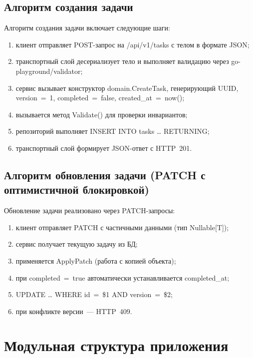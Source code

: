 \documentclass[a4paper,14pt]{extarticle}
\begin{document}
\subsection{Алгоритм создания задачи}

Алгоритм создания задачи включает следующие шаги:
\begin{enumerate}[leftmargin=1.25cm, itemsep=0pt]
  \item клиент отправляет POST-запрос на /api/v1/tasks с телом в формате JSON;
  \item транспортный слой десериализует тело и выполняет валидацию через go-playground/validator;
  \item сервис вызывает конструктор domain.CreateTask, генерирующий UUID, version~=~1, completed~=~false, created\_at~=~now();
  \item вызывается метод Validate() для проверки инвариантов;
  \item репозиторий выполняет INSERT INTO tasks \ldots{} RETURNING;
  \item транспортный слой формирует JSON-ответ с HTTP~201.
\end{enumerate}

\subsection{Алгоритм обновления задачи (PATCH с оптимистичной блокировкой)}

Обновление задачи реализовано через PATCH-запросы:
\begin{enumerate}[leftmargin=1.25cm, itemsep=0pt]
  \item клиент отправляет PATCH с частичными данными (тип Nullable[T]);
  \item сервис получает текущую задачу из БД;
  \item применяется ApplyPatch (работа с копией объекта);
  \item при completed~=~true автоматически устанавливается completed\_at;
  \item UPDATE \ldots{} WHERE id~=~\$1 AND version~=~\$2;
  \item при конфликте версии~--- HTTP~409.
\end{enumerate}

\clearpage
\section{Модульная структура приложения}
\end{document}
